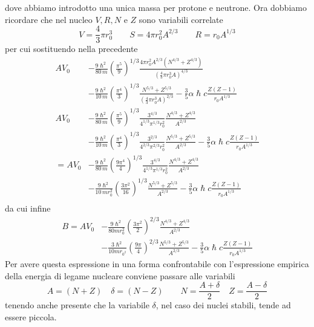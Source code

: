 dove abbiamo introdotto una unica massa per protone e neutrone.
Ora dobbiamo ricordare che nel nucleo $V, R, N$ e $Z$ sono variabili correlate
\[
V = \frac{4}{3} \pi r_{0}^{3} \qquad S = 4\pi r_{0}^{2}A^{2/3} \qquad R = r_{0}A^{1/3}
\]
per cui sostituendo nella precedente
\begin{align*}
	AV_{0} &- \frac{9 \hslash^{2}}{80 \, m} \left( \frac{\pi^{5}}{9} \right)^{1/3} \frac{4 \pi r_{0}^{2}A^{2/3}(N^{4/3}+Z^{4/3})}{\left( \frac{4}{3} \pi r_{0}^{3} A\right)^{4/3}} \\
	&- \frac{9 \hslash^{2}}{10 \, m} \left( \frac{\pi^{4}}{3} \right)^{1/3} \frac{N^{5/3}+Z^{5/3}}{\left( \frac{4}{3} \pi r_{0}^{3} A\right)^{2/3}} - \frac{3}{5} \alpha \hslash c \frac{Z(Z-1)}{r_{0}A^{1/3}} \\
	AV_{0} &- \frac{9 \hslash^{2}}{80 \, m} \left( \frac{\pi^{5}}{9} \right)^{1/3} \frac{3^{4/3}}{ 4^{1/3}\pi^{1/3}r_{0}^{2}} \frac{N^{4/3}+Z^{4/3}}{A^{2/3}} \\
	&- \frac{9 \hslash^{2}}{10 \, m} \left( \frac{\pi^{4}}{3} \right)^{1/3} \frac{3^{2/3}}{ 4^{2/3}\pi^{2/3}r_{0}^{2}}\frac{N^{5/3}+Z^{5/3}}{ A^{2/3}} - \frac{3}{5} \alpha \hslash c \frac{Z(Z-1)}{r_{0}A^{1/3}} \\
	= AV_{0} &- \frac{9 \hslash^{2}}{80 \, m} \left( \frac{9\pi^{4}}{4} \right)^{1/3} \frac{3^{4/3}}{ 4^{1/3}\pi^{1/3}r_{0}^{2}} \frac{N^{4/3}+Z^{4/3}}{A^{2/3}} \\
	&- \frac{9 \hslash^{2}}{10 \, mr_{0}^{2}} \left( \frac{3\pi^{2}}{16} \right)^{1/3} \frac{N^{5/3}+Z^{5/3}}{ A^{2/3}} - \frac{3}{5} \alpha \hslash c \frac{Z(Z-1)}{r_{0}A^{1/3}} \\
\end{align*}
da cui infine
\begin{align}
	B = A V_{0} &- \frac{9\hslash^{2}}{80 mr_{0}^{2}} \left( \frac{3\pi^{2}}{2} \right)^{2/3}\frac{N^{4/3}+Z^{4/3}}{A^{2/3}} \nonumber\\
	&- \frac{3\hslash^{2}}{10 mr_{0^{2}}}\left( \frac{9\pi}{4} \right)^{2/3} \frac{N^{5/3}+Z^{5/3}}{A^{2/3}} - \frac{3}{5} \alpha \hslash c \frac{Z(Z-1)}{r_{0}A^{1/3}}
	\label{eq:intermediate-calc-binding-energy-fermi-gas}
\end{align}
Per avere questa espressione in una forma confrontabile con l’espressione empirica della energia di legame nucleare conviene passare alle variabili
\[
A=(N+Z) \quad\delta = (N-Z) \qquad N = \frac{A+\delta}{2} \quad Z = \frac{A- \delta}{2}
\]
tenendo anche presente che la variabile $\delta$, nel caso dei nuclei stabili, tende ad essere piccola.

